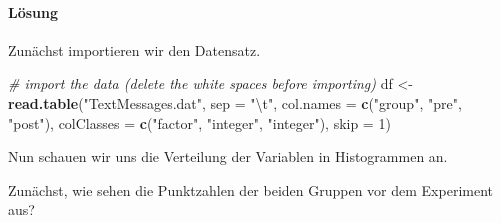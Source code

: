 \documentclass[]{article}
\newenvironment{Shaded}{\begin{snugshade}}{\end{snugshade}}
\newcommand{\CharTok}[1]{\textcolor[rgb]{0.31,0.60,0.02}{#1}}
\newcommand{\CommentTok}[1]{\textcolor[rgb]{0.56,0.35,0.01}{\textit{#1}}}
\newcommand{\DataTypeTok}[1]{\textcolor[rgb]{0.13,0.29,0.53}{#1}}
\newcommand{\DecValTok}[1]{\textcolor[rgb]{0.00,0.00,0.81}{#1}}
\newcommand{\KeywordTok}[1]{\textcolor[rgb]{0.13,0.29,0.53}{\textbf{#1}}}
\newcommand{\NormalTok}[1]{#1}
\newcommand{\StringTok}[1]{\textcolor[rgb]{0.31,0.60,0.02}{#1}}
\let\oldparagraph\paragraph
\renewcommand{\paragraph}[1]{\oldparagraph{#1}\mbox{}}
\begin{document}
\paragraph{Lösung}

Zunächst importieren wir den Datensatz.

\begin{Shaded}
\begin{Highlighting}[]
\CommentTok{# import the data (delete the white spaces before importing)}
\NormalTok{df <-}\StringTok{ }\KeywordTok{read.table}\NormalTok{(}\StringTok{"TextMessages.dat"}\NormalTok{, }\DataTypeTok{sep =} \StringTok{"}\CharTok{\textbackslash{}t}\StringTok{"}\NormalTok{, }\DataTypeTok{col.names =} \KeywordTok{c}\NormalTok{(}\StringTok{"group"}\NormalTok{, }\StringTok{"pre"}\NormalTok{, }\StringTok{"post"}\NormalTok{), }\DataTypeTok{colClasses =} \KeywordTok{c}\NormalTok{(}\StringTok{"factor"}\NormalTok{, }\StringTok{"integer"}\NormalTok{, }\StringTok{"integer"}\NormalTok{), }\DataTypeTok{skip =} \DecValTok{1}\NormalTok{)}
\end{Highlighting}
\end{Shaded}

Nun schauen wir uns die Verteilung der Variablen in Histogrammen an.

Zunächst, wie sehen die Punktzahlen der beiden Gruppen vor dem
Experiment aus?
\end{document}
